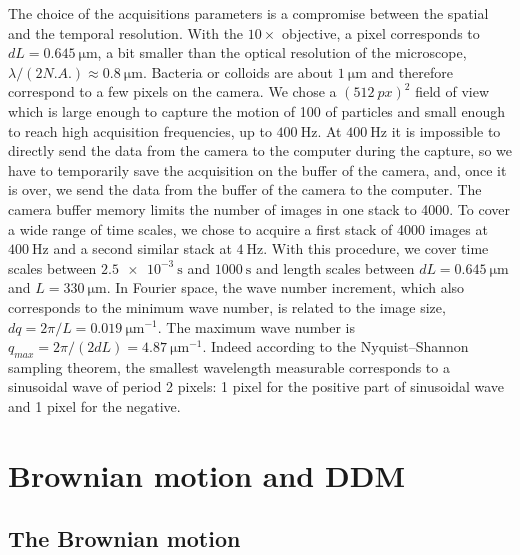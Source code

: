 \documentclass[%
 aip,
 jmp,%
 amsmath,amssymb,
reprint,%
]{revtex4-1}
\begin{document}
The choice of the acquisitions parameters is a compromise between the spatial and the temporal resolution. With the $10\times$ objective, a pixel corresponds to $dL=\SI{0.645}{\micro\meter}$, a bit smaller than the optical resolution of the microscope, $\lambda/(2N.A.)\approx\SI{0.8}{\micro\meter} $. Bacteria or colloids are about $\SI{1}{\micro\meter}$ and therefore correspond to a few pixels on the camera. We chose a $(\SI{512}{px})^2$ field of view which is large enough to capture the motion of 100 of particles and small enough to reach high acquisition frequencies, up to $\SI{400}{\hertz}$. At $\SI{400}{\hertz}$ it is impossible to directly send the data from the camera to the computer during the capture, so we have to temporarily save the acquisition on the buffer of the camera, and, once it is over, we send the data from the buffer of the camera to the computer. The camera buffer memory limits the number of images in one stack to 4000. To cover a wide range of time scales, we chose to acquire a first stack of 4000 images at $\SI{400}{\hertz}$ and a second similar stack at $\SI{4}{\hertz}$. With this procedure, we cover time scales between $\SI{2.5e-3}{\second}$ and $\SI{1000}{\second}$ and length scales between $dL=\SI{0.645}{\micro\meter}$ and $L=\SI{330}{\micro\meter}$. In Fourier space, the wave number increment, which also corresponds to the minimum wave number, is related to the image size, $dq=2\pi/L=\SI{0.019}{\micro\meter^{-1}}$. The maximum wave number is $q_{max}=2\pi/(2dL)=\SI{4.87}{\micro\meter^{-1}}$. Indeed according to the Nyquist–Shannon sampling theorem, the smallest wavelength measurable corresponds to a sinusoidal wave of period 2 pixels: 1 pixel for the positive part of sinusoidal wave and 1 pixel for the negative.

\section{Brownian motion and DDM}
\label{sec:BrownSection}

\subsection{The Brownian motion}
\end{document}
